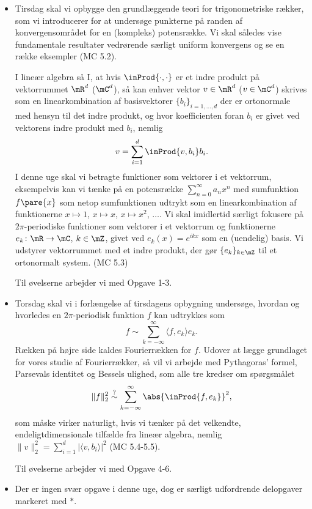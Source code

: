 \begin{itemize}
    \item Tirsdag skal vi opbygge den grundlæggende teori for trigonometriske rækker, som vi introducerer for at undersøge punkterne på randen af konvergensområdet for en (kompleks) potensrække. Vi skal således vise fundamentale resultater vedrørende særligt uniform konvergens og se en række eksempler (MC 5.2).
    
    I lineær algebra så I, at hvis $\inProd{\cdot,\cdot}$ er et indre produkt på vektorrummet $\mR^d$ ($\mC^d$), så kan enhver vektor $v \in \mR^d$ ($v \in \mC^d$) skrives som en linearkombination af basisvektorer $\{b_i\}_{i=1, \ldots, d}$ der er ortonormale med hensyn til det indre produkt, og hvor koefficienten foran $b_i$ er givet ved vektorens indre produkt med $b_i$, nemlig
    $$ v=\sum_{i=1}^d \inProd{v, b_i} b_i. $$
    I denne uge skal vi betragte funktioner som vektorer i et vektorrum, eksempelvis kan vi tænke på en potensrække $\sum_{n=0}^\infty a_nx^n$ med sumfunktion $f\pare{x}$ som netop sumfunktionen udtrykt som en linearkombination af funktionerne $x\mapsto 1$, $x\mapsto x$, $x\mapsto x^2$, $\ldots$. Vi skal imidlertid særligt fokusere på $2\pi$-periodiske funktioner som vektorer i et vektorrum og funktionerne $e_k\colon\mR\to\mC$, $k \in \mZ$, givet ved $e_k(x)=e^{ikx}$ som en (uendelig) basis. Vi udstyrer vektorrummet med et indre produkt, der gør $\{e_k\}_{k \in \mZ}$ til et ortonormalt system. (MC 5.3)
    
    Til øvelserne arbejder vi med Opgave 1-3.
    
    \item Torsdag skal vi i forlængelse af tirsdagens opbygning undersøge, hvordan og hvorledes en $2\pi$-periodisk funktion $f$ kan udtrykkes som
    $$f \sim \sum_{k=-\infty} ^\infty \langle f , e_k \rangle e_k. $$
    Rækken på højre side kaldes Fourierrækken for $f$. Udover at lægge grundlaget for vores studie af Fourierrækker, så vil vi arbejde med Pythagoras' formel, Parsevals identitet og Bessels ulighed, som alle tre kredser om spørgsmålet
    $$\|f\|_2^2 \overset{?}{\sim} \sum_{k=-\infty} ^\infty
        \abs{\inProd{f,e_k}}^2, $$
    som måske virker naturligt, hvis vi tænker på det velkendte, endeligtdimensionale tilfælde fra lineær algebra, nemlig $\|v\|_2^2= \sum_{i=1}^d |\langle v, b_i \rangle|^2$ (MC 5.4-5.5).
    
    Til øvelserne arbejder vi med Opgave 4-6.
    
    \item Der er ingen svær opgave i denne uge, dog er særligt udfordrende delopgaver markeret med $\ast$.
\end{itemize}

